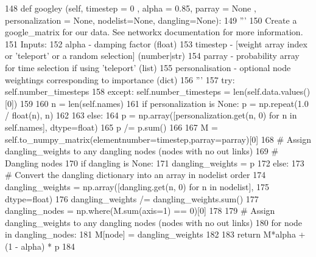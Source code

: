 \begin{DoxyCode}
148       \textcolor{keyword}{def }googley (self, timestep = 0 , alpha = 0.85, parray = None , personalization = None, 
      nodelist=None, dangling=None):
149             \textcolor{stringliteral}{''' }
150 \textcolor{stringliteral}{            Create a google\_matrix for our data. See networkx documentation for more information. }
151 \textcolor{stringliteral}{              Inputs: }
152 \textcolor{stringliteral}{                alpha - damping factor (float)}
153 \textcolor{stringliteral}{                timestep - [weight array index or 'teleport' or a random selection] (number|str)}
154 \textcolor{stringliteral}{                parray - probability array for time selection if using 'teleport' (list)}
155 \textcolor{stringliteral}{                personalisation - optional node weightings corresponding to importance (dict)}
156 \textcolor{stringliteral}{                '''}
157             \textcolor{keywordflow}{try}: self.number\_timesteps
158             \textcolor{keywordflow}{except}: self.number\_timesteps = len(self.data.values()[0])
159                
160             n = len(self.names)
161             \textcolor{keywordflow}{if} personalization \textcolor{keywordflow}{is} \textcolor{keywordtype}{None}:  p = np.repeat(1.0 / float(n), n)
162             
163             \textcolor{keywordflow}{else}:
164                   p = np.array([personalization.get(n, 0) \textcolor{keywordflow}{for} n \textcolor{keywordflow}{in} self.names], dtype=float)
165                   p /= p.sum()
166             
167             M = self.to\_numpy\_matrix(elementnumber=timestep,parray=parray)[0]
168             \textcolor{comment}{# Assign dangling\_weights to any dangling nodes (nodes with no out links)}
169             \textcolor{comment}{# Dangling nodes}
170             \textcolor{keywordflow}{if} dangling \textcolor{keywordflow}{is} \textcolor{keywordtype}{None}:
171                 dangling\_weights = p
172             \textcolor{keywordflow}{else}:
173                 \textcolor{comment}{# Convert the dangling dictionary into an array in nodelist order}
174                 dangling\_weights = np.array([dangling.get(n, 0) \textcolor{keywordflow}{for} n \textcolor{keywordflow}{in} nodelist],
175                                             dtype=float)
176                 dangling\_weights /= dangling\_weights.sum()
177             dangling\_nodes = np.where(M.sum(axis=1) == 0)[0]
178 
179             \textcolor{comment}{# Assign dangling\_weights to any dangling nodes (nodes with no out links)}
180             \textcolor{keywordflow}{for} node \textcolor{keywordflow}{in} dangling\_nodes:
181                 M[node] = dangling\_weights
182                 
183             \textcolor{keywordflow}{return} M*alpha + (1 - alpha) * p
184 
\end{DoxyCode}
\mbox{\label{classdsmacc_1_1graph_1_1STPR_1_1Sparse3D_aa74d5a620b2d4e87d20c8355f46bde67}} 
